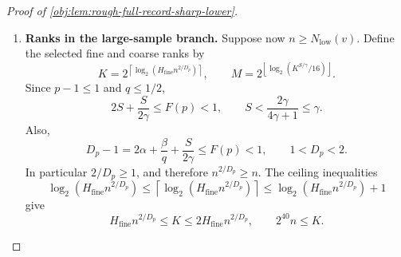 \documentclass[11pt]{article}
\begin{document}
\begin{proof}[Proof of \cref{obj:lem:rough-full-record-sharp-lower}]
\begin{enumerate}
\[<\frac12.
\]
The model-supremum bound is supplied by
\cref{obj:lem:paired-tent-full-record-lower}:
\[
d_0\le D_v.
\]
Together with the multiplier comparison, these canonical calculations give, for every positive-weight alternative support law,
\[
P\in\mathcal M_v,
\qquad
c_vn^{-E_4(p)}
\le c_0^{\mathrm e}n^{-E_0(p)}
\le d(P)<d_0.
\]
Finally, for every size-valid test \(\phi\), averaging over its independent uniform seed and using the total-variation expectation bound gives
\[
\begin{aligned}
\sup_{\substack{P\in\mathcal M_v\\
d(P)\ge c_0^{\mathrm e}n^{-E_0(p)}}}
\{1-\mathsf R_n(P,\phi)\}
&\ge\int\{1-\mathsf R_n(P,\phi)\}\,\pi_{1,n,v}(dP)\\
&\ge\frac9{10}
-\operatorname{TV}(P_0^{\otimes n},\overline P_1^{(n)})
>\frac25.
\end{aligned}
\]
Taking the infimum over size-valid tests proves the canonical risk bound
\[
B_n\!\left(v,c_0^{\mathrm e}n^{-E_0(p)}\right)\ge\frac25.
\]

For each test satisfying the size constraint, decreasing the separation enlarges the alternative set, so
\[
\sup_{\substack{P\in\mathcal M_v\\
d(P)\ge c_0^{\mathrm e}n^{-E_0(p)}}}
\{1-\mathsf R_n(P,\phi)\}
\le
\sup_{\substack{P\in\mathcal M_v\\
d(P)\ge c_vn^{-E_4(p)}}}
\{1-\mathsf R_n(P,\phi)\}.
\]
The positive-weight alternative supplied by the paired-tent construction makes both sets nonempty. Taking infima over the same size-valid tests and using its risk bound gives
\[
\frac25
\le B_n\!\left(v,c_0^{\mathrm e}n^{-E_0(p)}\right)
\le B_n\!\left(v,c_vn^{-E_4(p)}\right).
\]
Finally, \(n<N_{\mathrm{low}}(v)\) excludes the hypothesis
\(n\ge N_{\mathrm{low}}(v)\) of the additional rank and activity conclusions.

\item \textbf{Ranks in the large-sample branch.}
Suppose now \(n\ge N_{\mathrm{low}}(v)\). Define the selected fine and coarse ranks by
\[
K=
2^{\left\lceil\log_2(H_{\mathrm{fine}}n^{2/D_p})\right\rceil},
\qquad
M=
2^{\left\lfloor\log_2(K^{S/\gamma}/16)\right\rfloor}.
\]
Since \(p-1\le1\) and \(q\le1/2\),
\[
2S+\frac{S}{2\gamma}\le F(p)<1,
\qquad
S<\frac{2\gamma}{4\gamma+1}\le\gamma.
\]
Also,
\[
D_p-1
=
2\alpha+\frac{\beta}{q}+\frac{S}{2\gamma}
\le F(p)<1,
\qquad
1<D_p<2.
\]
In particular \(2/D_p\ge1\), and therefore \(n^{2/D_p}\ge n\).
The ceiling inequalities
\[
\log_2(H_{\mathrm{fine}}n^{2/D_p})
\le
\left\lceil\log_2(H_{\mathrm{fine}}n^{2/D_p})\right\rceil
\le
\log_2(H_{\mathrm{fine}}n^{2/D_p})+1
\]
give
\[
H_{\mathrm{fine}}n^{2/D_p}\le K
\le2H_{\mathrm{fine}}n^{2/D_p},
\qquad
2^{40}n\le K.
\]


\end{enumerate}
\end{proof}
\end{document}
